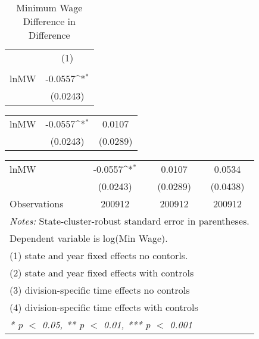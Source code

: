\begin{table}[htbp]\centering
\def\sym#1{\ifmmode^{#1}\else\(^{#1}\)\fi}
\caption{Minimum Wage Difference in Difference\label{auto}}
\begin{tabular}{l*{1}{c}}
\hline\hline
                    &\multicolumn{1}{c}{(1)}\\
                    &\multicolumn{1}{c}{ }\\
\hline
lnMW                &     -0.0557\sym{*}  \\
                    &    (0.0243)         \\
\hline\hline
\end{tabular}
\end{table}
{
\def\sym#1{\ifmmode^{#1}\else\(^{#1}\)\fi}
\begin{tabular}{l*{2}{c}}
\hline\hline
\hline
lnMW                &     -0.0557\sym{*}  &      0.0107         \\
                    &    (0.0243)         &    (0.0289)         \\
\hline\hline
\end{tabular}
}
{
\def\sym#1{\ifmmode^{#1}\else\(^{#1}\)\fi}
\begin{tabular}{l*{3}{c}}
\hline\hline
\hline
lnMW                &     -0.0557\sym{*}  &      0.0107         &      0.0534         \\
                    &    (0.0243)         &    (0.0289)         &    (0.0438)         \\
\hline
Observations        &      200912         &      200912         &      200912         \\
\hline\hline
\multicolumn{4}{l}{\footnotesize \textit{Notes:} State-cluster-robust standard error in parentheses.}\\
\multicolumn{4}{l}{\footnotesize Dependent variable is log(Min Wage).}\\
\multicolumn{4}{l}{\footnotesize (1) state and year fixed effects no contorls.}\\
\multicolumn{4}{l}{\footnotesize (2) state and year fixed effects with controls}\\
\multicolumn{4}{l}{\footnotesize (3) division-specific time effects no controls}\\
\multicolumn{4}{l}{\footnotesize (4) division-specific time effects with controls}\\
\multicolumn{4}{l}{\footnotesize \textit{* p $<$ 0.05, ** p $<$ 0.01, *** p $<$ 0.001}}\\
\end{tabular}
}
